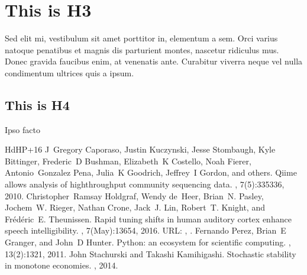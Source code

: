 \section{This is H3}
\label{\detokenize{intro:this-is-h3}}
\sphinxAtStartPar
Sed elit mi, vestibulum sit amet porttitor in, elementum a sem. Orci varius natoque penatibus et magnis dis parturient montes, nascetur ridiculus mus. Donec gravida faucibus enim, at venenatis ante. Curabitur viverra neque vel nulla condimentum ultrices quis a ipsum.


\subsection{This is H4}
\label{\detokenize{intro:this-is-h4}}
\sphinxAtStartPar
Ipso facto

\begin{sphinxthebibliography}{HdHP+16}
\sphinxAtStartPar
J Gregory Caporaso, Justin Kuczynski, Jesse Stombaugh, Kyle Bittinger, Frederic D Bushman, Elizabeth K Costello, Noah Fierer, Antonio Gonzalez Pena, Julia K Goodrich, Jeffrey I Gordon, and others. Qiime allows analysis of high\sphinxhyphen{}throughput community sequencing data. , 7(5):335\textendash{}336, 2010.
\sphinxAtStartPar
Christopher Ramsay Holdgraf, Wendy de Heer, Brian N. Pasley, Jochem W. Rieger, Nathan Crone, Jack J. Lin, Robert T. Knight, and Frédéric E. Theunissen. Rapid tuning shifts in human auditory cortex enhance speech intelligibility. , 7(May):13654, 2016. URL: , .
\sphinxAtStartPar
Fernando Perez, Brian E Granger, and John D Hunter. Python: an ecosystem for scientific computing. , 13(2):13\textendash{}21, 2011.
\sphinxAtStartPar
John Stachurski and Takashi Kamihigashi. Stochastic stability in monotone economies. , 2014.
\end{sphinxthebibliography}



\renewcommand{\indexname}{Index}
\printindex
